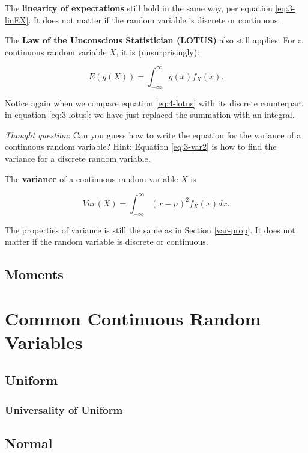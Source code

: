 \documentclass[
]{book}
\begin{document}
The \textbf{linearity of expectations} still hold in the same way, per equation \eqref{eq:3-linEX}. It does not matter if the random variable is discrete or continuous.

The \textbf{Law of the Unconscious Statistician (LOTUS)} also still applies. For a continuous random variable \(X\), it is (unsurprisingly):

\begin{equation} 
E(g(X)) = \int_{-\infty}^{\infty} g(x) f_X(x).
\label{eq:4-lotus}
\end{equation}

Notice again when we compare equation \eqref{eq:4-lotus} with its discrete counterpart in equation \eqref{eq:3-lotus}: we have just replaced the summation with an integral.

\emph{Thought question}: Can you guess how to write the equation for the variance of a continuous random variable? Hint: Equation \eqref{eq:3-var2} is how to find the variance for a discrete random variable.

The \textbf{variance} of a continuous random variable \(X\) is

\begin{equation} 
Var(X) = \int_{-\infty}^{\infty} (x-\mu)^2 f_X(x) dx.
\label{eq:4-var}
\end{equation}

The properties of variance is still the same as in Section \ref{var-prop}. It does not matter if the random variable is discrete or continuous.

\subsection{Moments}\label{moments}

\section{Common Continuous Random Variables}\label{common-continuous-random-variables}

\subsection{Uniform}\label{uniform}

\subsubsection{Universality of Uniform}\label{universality-of-uniform}

\subsection{Normal}\label{normal}

  
\end{document}

